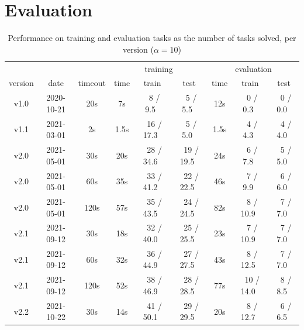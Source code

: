 \documentclass[a4paper]{llncs}
\begin{document}
\section{Evaluation}
\label{eval}


\begin{table}[t]
  \centering
  \caption{Performance on training and evaluation tasks as the number of tasks solved, per version ($\alpha = 10$)}
  \begin{tabular}{|c|c|c|c|c|c|c|c|c|}
    \hline
     & & & \multicolumn{3}{c|}{training} & \multicolumn{3}{c|}{evaluation} \\
    version & date & timeout & time & train & test & time & train & test \\
    \hline
    v1.0 & 2020-10-21 & 20s & 7s & ~8 / 9.5~ & ~5 / 5.5~ & 12s & ~0 / 0.3~ & ~0 / 0.0~ \\
    \hline
    v1.1 & 2021-03-01 & 2s & 1.5s & ~16 / 17.3~ & ~5 / 5.0~ & 1.5s & ~4 / 4.3~ & ~4 / 4.0~ \\
    \hline
    v2.0 & 2021-05-01 & 30s & 20s & ~28 / 34.6~ & ~19 / 19.5~ & 24s & ~6 / 7.8~  & ~5 / 5.0~ \\
    v2.0 & 2021-05-01 & 60s & 35s & ~33 / 41.2~ & ~22 / 22.5~ & 46s & ~7 / 9.9~ & ~6 / 6.0~ \\
    v2.0 & 2021-05-01 & 120s & 57s & ~35 / 43.5~ & ~24 / 24.5~ & 82s & ~8 / 10.9~ & ~7 / 7.0~ \\
    \hline
    v2.1 & 2021-09-12 & 30s & 18s & ~32 / 40.0~ & ~25 / 25.5~ & 23s & ~7 / 10.9~ & ~7 / 7.0~ \\
    v2.1 & 2021-09-12 & 60s & 32s & ~36 / 44.9~ & ~27 / 27.5~ & 43s & ~8 / 12.5~ & ~7 / 7.0~ \\
    v2.1 & 2021-09-12 & 120s & 52s & ~38 / 46.9~ & ~28 / 28.5~ & 77s & ~10 / 14.0~ & ~8 / 8.5~ \\
    \hline
    v2.2 & 2021-10-22 & 30s & 14s & ~41 / 50.1~ & ~29 / 29.5~ & 20s & ~8 / 12.7~ & ~6 / 6.5~ \\

\end{tabular}
\end{table}
\end{document}
